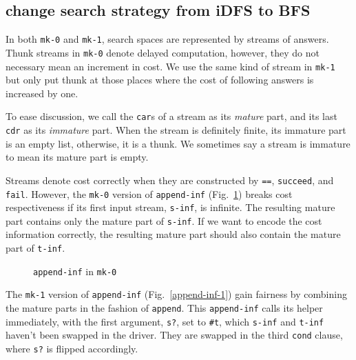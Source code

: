 \documentclass[format=acmlarge, review=true, authordraft=true]{acmart}
\begin{document}

\subsection{change search strategy from iDFS to BFS}

In both \texttt{mk-0} and \texttt{mk-1}, search spaces are represented by 
streams of answers. Thunk streams in \texttt{mk-0} denote delayed 
computation, however, they do not necessary mean an increment in cost. We use 
the same kind of stream in \texttt{mk-1} but only put thunk at those places 
where the cost of following answers is increased by one.

To ease discussion, we call the \texttt{car}s of a stream as its \emph{mature} 
part, and its last \texttt{cdr} as its \emph{immature} part. When the stream is 
definitely finite, its immature part is an empty list, otherwise, it is a 
thunk. We sometimes say a stream is immature to mean its mature part is empty.

Streams denote cost correctly when they are constructed by \texttt{==}, 
\texttt{succeed}, and \texttt{fail}. However, the \texttt{mk-0} version of 
\texttt{append-inf} (Fig.~\ref{append-inf-0}) breaks cost respectiveness if its 
first input stream, \texttt{s-inf},  is infinite. The resulting mature part 
contains only the mature part of \texttt{s-inf}. If we want to encode the 
cost information correctly, the resulting mature part should also contain the 
mature part of \texttt{t-inf}.

\begin{figure}
	 	
	 \caption{\texttt{append-inf} in \texttt{mk-0}}
	 \label{append-inf-0}
\end{figure}

The \texttt{mk-1} version of \texttt{append-inf} (Fig.~\ref{append-inf-1}) 
gain fairness by combining the mature parts in the fashion of \texttt{append}. 
This \texttt{append-inf} calls its helper immediately, with the first argument, 
\texttt{s?}, set to \texttt{\#{}t}, which \texttt{s-inf} and \texttt{t-inf} haven't been swapped in the driver. They are swapped in the third \texttt{cond} clause, where \texttt{s?} is flipped accordingly.
\end{document}

